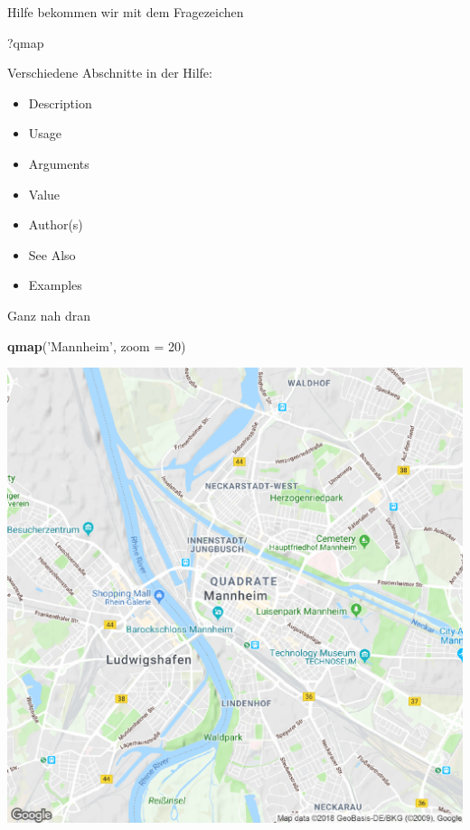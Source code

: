 \documentclass[ignorenonframetext,]{beamer}
\newenvironment{Shaded}{\begin{snugshade}}{\end{snugshade}}
\newcommand{\KeywordTok}[1]{\textcolor[rgb]{0.13,0.29,0.53}{\textbf{#1}}}
\newcommand{\DataTypeTok}[1]{\textcolor[rgb]{0.13,0.29,0.53}{#1}}
\newcommand{\DecValTok}[1]{\textcolor[rgb]{0.00,0.00,0.81}{#1}}
\newcommand{\StringTok}[1]{\textcolor[rgb]{0.31,0.60,0.02}{#1}}
\newcommand{\NormalTok}[1]{#1}
\providecommand{\tightlist}{%
  \setlength{\itemsep}{0pt}\setlength{\parskip}{0pt}}
\begin{document}
\begin{frame}[fragile]{Hilfe bekommen wir mit dem Fragezeichen}

\begin{Shaded}
\begin{Highlighting}[]
\NormalTok{?qmap}
\end{Highlighting}
\end{Shaded}

Verschiedene Abschnitte in der Hilfe:

\begin{itemize}
\tightlist
\item
  Description
\item
  Usage
\item
  Arguments
\item
  Value
\item
  Author(s)
\item
  See Also
\item
  Examples
\end{itemize}

\end{frame}

\begin{frame}[fragile]{Ganz nah dran}

\begin{Shaded}
\begin{Highlighting}[]
\KeywordTok{qmap}\NormalTok{(}\StringTok{'Mannheim'}\NormalTok{, }\DataTypeTok{zoom =} \DecValTok{20}\NormalTok{)}
\end{Highlighting}
\end{Shaded}

\includegraphics{figure/ham_map_z20.pdf}

\end{frame}
\end{document}
